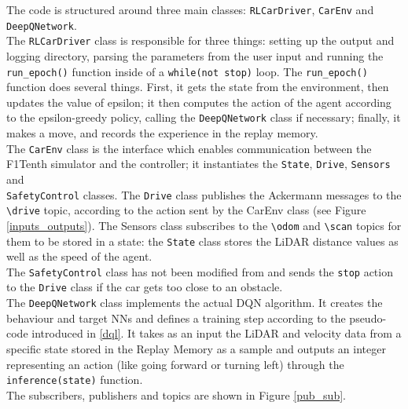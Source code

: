 The code is structured around three main classes: \verb|RLCarDriver|, \verb|CarEnv| and \\ \verb|DeepQNetwork|.	\\
The \verb |RLCarDriver| class is responsible for three things: setting up the output and logging directory, parsing the parameters from the user input and running the \verb |run_epoch()| function inside of a \verb |while(not stop)| loop. The \verb|run_epoch()| function does several things. First, it gets the state from the environment, then updates the value of epsilon; it then computes the action of the agent according to the epsilon-greedy policy, calling the \verb|DeepQNetwork| class if necessary; finally, it makes a move, and records the experience in the replay memory. \\
The \verb |CarEnv| class is the interface which enables communication between the F1Tenth simulator and the controller; it instantiates the \verb|State|, \verb|Drive|, \verb|Sensors| and \\ 
\verb|SafetyControl| classes. The \verb|Drive| class publishes the Ackermann messages to the \verb|\drive| topic, according to the action sent by the CarEnv class (see Figure \ref{inputs_outputs}). The Sensors class subscribes to the \verb|\odom| and \verb|\scan| topics for them to be stored in a state: the \verb|State| class stores the LiDAR distance values as well as the speed of the agent. \\
The \verb|SafetyControl| class has not been modified from \cite{bosello} and sends the \verb|stop| action to the \verb|Drive| class if the car gets too close to an obstacle. \\
The \verb|DeepQNetwork| class implements the actual DQN algorithm. It creates the behaviour and target NNs and defines a training step according to the pseudo-code introduced in \ref{dql}. It takes as an input the LiDAR and velocity data from a specific state stored in the Replay Memory as a sample and outputs an integer representing an action (like going forward or turning left) through the \verb|inference(state)| function. \\
The subscribers, publishers and topics are shown in Figure \ref{pub_sub}.
